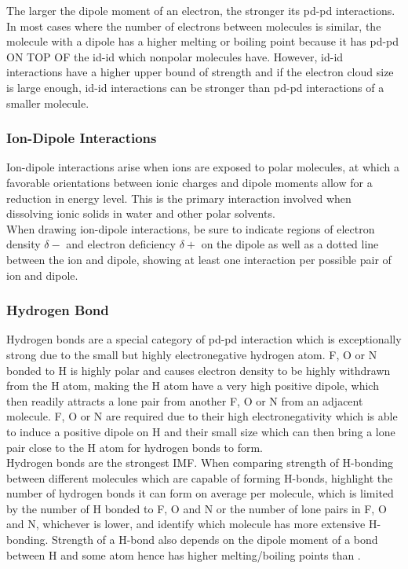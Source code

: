 \documentclass[../main]{subfiles}
\begin{document}
	The larger the dipole moment of an electron, the stronger its pd-pd interactions. \\

	In most cases where the number of electrons between molecules is similar, the molecule with a dipole has a higher melting or boiling point because it has pd-pd ON TOP OF the id-id which nonpolar molecules have. However, id-id interactions have a higher upper bound of strength and if the electron cloud size is large enough, id-id interactions can be stronger than pd-pd interactions of a smaller molecule.

	\subsubsection{Ion-Dipole Interactions}

	Ion-dipole interactions arise when ions are exposed to polar molecules, at which a favorable orientations between ionic charges and dipole moments allow for a reduction in energy level. This is the primary interaction involved when dissolving ionic solids in water and other polar solvents. \\

	When drawing ion-dipole interactions, be sure to indicate regions of electron density \(\delta-\) and electron deficiency \(\delta+\) on the dipole as well as a dotted line between the ion and dipole, showing at least one interaction per possible pair of ion and dipole.

	\subsubsection{Hydrogen Bond}

	Hydrogen bonds are a special category of pd-pd interaction which is exceptionally strong due to the small but highly electronegative hydrogen atom. F, O or N bonded to H is highly polar and causes electron density to be highly withdrawn from the H atom, making the H atom have a very high positive dipole, which then readily attracts a lone pair from another F, O or N from an adjacent molecule. F, O or N are required due to their high electronegativity which is able to induce a positive dipole on H and their small size which can then bring a lone pair close to the H atom for hydrogen bonds to form. \\

	Hydrogen bonds are the strongest IMF. When comparing strength of H-bonding between different molecules which are capable of forming H-bonds, highlight the number of hydrogen bonds it can form on average per molecule, which is limited by the number of H bonded to F, O and N or the number of lone pairs in F, O and N, whichever is lower, and identify which molecule has more extensive H-bonding. Strength of a H-bond also depends on the dipole moment of a bond between H and some atom hence  has higher melting/boiling points than . \\
\end{document}
